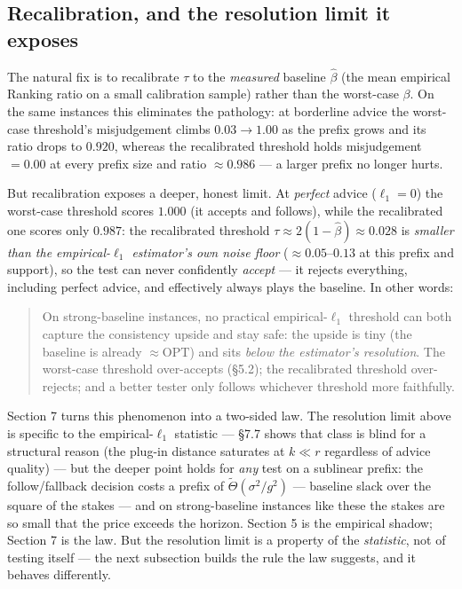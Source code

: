 \subsection{Recalibration, and the resolution limit it
exposes}

The natural fix is to recalibrate \(\tau\) to the \emph{measured}
baseline \(\hat\beta\) (the mean empirical Ranking ratio on a small
calibration sample) rather than the worst-case \(\beta\). On the same
instances this eliminates the pathology: at borderline advice the
worst-case threshold's misjudgement climbs \(0.03\to1.00\) as the prefix
grows and its ratio drops to \(0.920\), whereas the recalibrated
threshold holds misjudgement \(=0.00\) at every prefix size and ratio
\(\approx0.986\) --- a larger prefix no longer hurts.

But recalibration exposes a deeper, honest limit. At \emph{perfect}
advice (\(\ell_1=0\)) the worst-case threshold scores \(1.000\) (it
accepts and follows), while the recalibrated one scores only \(0.987\):
the recalibrated threshold \(\tau\approx 2(1-\hat\beta)\approx 0.028\)
is \emph{smaller than the empirical-\(\ell_1\) estimator's own noise
floor} (\(\approx 0.05\)--\(0.13\) at this prefix and support), so the
test can never confidently \emph{accept} --- it rejects everything,
including perfect advice, and effectively always plays the baseline. In
other words:

\begin{quote}
On strong-baseline instances, no practical empirical-\(\ell_1\)
threshold can both capture the consistency upside and stay safe: the
upside is tiny (the baseline is already \(\approx\mathrm{OPT}\)) and
sits \emph{below the estimator's resolution}. The worst-case threshold
over-accepts (§5.2); the recalibrated threshold over-rejects; and a
better tester only follows whichever threshold more faithfully.
\end{quote}

Section 7 turns this phenomenon into a two-sided law. The resolution
limit above is specific to the empirical-\(\ell_1\) statistic --- §7.7
shows that class is blind for a structural reason (the plug-in distance
saturates at \(k \ll r\) regardless of advice quality) --- but the
deeper point holds for \emph{any} test on a sublinear prefix: the
follow/fallback decision costs a prefix of
\(\tilde\Theta(\sigma^2/g^2)\) --- baseline slack over the square of the
stakes --- and on strong-baseline instances like these the stakes are so
small that the price exceeds the horizon. Section 5 is the empirical
shadow; Section 7 is the law. But the resolution limit is a property of
the \emph{statistic}, not of testing itself --- the next subsection
builds the rule the law suggests, and it behaves differently.

